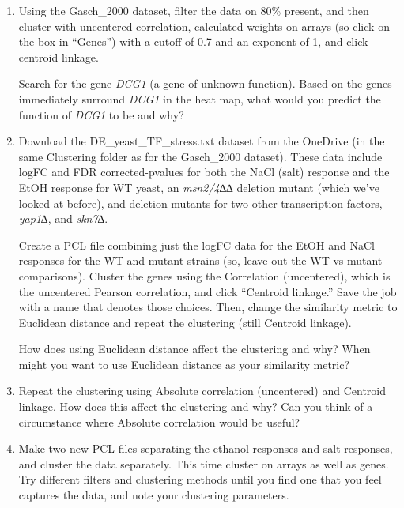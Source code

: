 \documentclass[
]{book}
\begin{document}
\begin{enumerate}
\def\labelenumi{\arabic{enumi}.}
\item
  Using the Gasch\_2000 dataset, filter the data on 80\% present, and then cluster with uncentered correlation, calculated weights on arrays (so click on the box in ``Genes'') with a cutoff of 0.7 and an exponent of 1, and click centroid linkage.

  Search for the gene \emph{DCG1} (a gene of unknown function). Based on the genes immediately surround \emph{DCG1} in the heat map, what would you predict the function of \emph{DCG1} to be and why?
\item
  Download the DE\_yeast\_TF\_stress.txt dataset from the OneDrive (in the same Clustering folder as for the Gasch\_2000 dataset). These data include logFC and FDR corrected-pvalues for both the NaCl (salt) response and the EtOH response for WT yeast, an \emph{msn2/4∆}∆ deletion mutant (which we've looked at before), and deletion mutants for two other transcription factors, \emph{yap1}∆, and \emph{skn7}∆.

  Create a PCL file combining just the logFC data for the EtOH and NaCl responses for the WT and mutant strains (so, leave out the WT vs mutant comparisons). Cluster the genes using the Correlation (uncentered), which is the uncentered Pearson correlation, and click ``Centroid linkage.'' Save the job with a name that denotes those choices. Then, change the similarity metric to Euclidean distance and repeat the clustering (still Centroid linkage).

  How does using Euclidean distance affect the clustering and why? When might you want to use Euclidean distance as your similarity metric?
\item
  Repeat the clustering using Absolute correlation (uncentered) and Centroid linkage. How does this affect the clustering and why? Can you think of a circumstance where Absolute correlation would be useful?
\item
  Make two new PCL files separating the ethanol responses and salt responses, and cluster the data separately. This time cluster on arrays as well as genes. Try different filters and clustering methods until you find one that you feel captures the data, and note your clustering parameters.


\end{enumerate}
\end{document}
